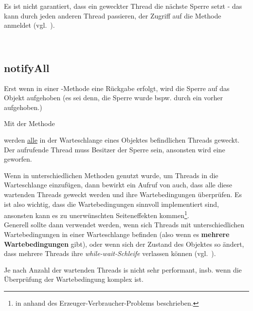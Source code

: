 \begin{tcolorbox}
    Es ist nicht garantiert, dass ein geweckter Thread die nächste Sperre setzt - das kann durch jeden anderen Thread passieren, der Zugriff auf die Methode anmeldet (vgl.~\cite[61]{Oec22}).
\end{tcolorbox}\\

\subsection{notifyAll}

Erst wenn in einer -Methode eine Rückgabe erfolgt, wird die Sperre auf das Objekt aufgehoben (es sei denn, die Sperre wurde bspw. durch ein  vorher aufgehoben.)

\noindent
Mit der Methode

\begin{center}
\end{center}

\noindent
werden \ul{alle} in der Warteschlange eines Objektes befindlichen Threads geweckt.
\noindent
Der aufrufende Thread muss Besitzer der Sperre sein, ansonsten wird eine  geworfen.\\

\begin{tcolorbox}
Wenn in unterschiedlichen Methoden  genutzt wurde, um Threads in die Warteschlange einzufügen, dann bewirkt ein Aufruf von  auch, dass alle diese wartenden Threads geweckt werden und ihre Wartebedingungen überprüfen.
Es ist also wichtig, dass die Wartebedingungen sinnvoll implementiert sind, ansonsten kann es zu unerwünschten Seiteneffekten kommen\footnote {
    in \cite[71 ff.]{Oec22} anhand des Erzeuger-Verbraucher-Problems beschrieben.
}.\\
Generell sollte  dann verwendet werden, wenn sich Threads mit unterschiedlichen Wartebedingungen in einer Warteschlange befinden (also wenn es \textbf{mehrere Wartebedingungen} gibt), oder wenn sich der Zustand des Objektes so ändert, dass mehrere Threads ihre \textit{while-wait-Schleife} verlassen können (vgl.~\cite[73]{Oec22}).
\end{tcolorbox}


\noindent
Je nach Anzahl der wartenden Threads is  nicht sehr performant, insb. wenn die Überprüfung der Wartebedingung komplex ist.


